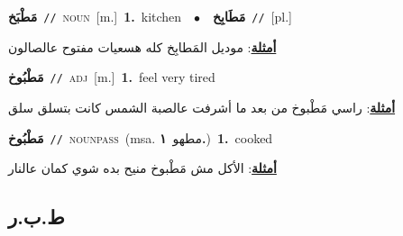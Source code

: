 \documentclass[10pt,a4paper,twoside]{article} %
\begin{document}
\begin{multicols}{2}
{\setlength\topsep{0pt}\textbf{\foreignlanguage{arabic}{مَطْبَخ}}\ {\color{gray}\texttt{//}\color{black}}\ \textsc{noun}\ [m.]\ \textbf{1.}~kitchen\ \ $\bullet$\ \ \setlength\topsep{0pt}\textbf{\foreignlanguage{arabic}{مَطَابِخ}}\ {\color{gray}\texttt{//}\color{black}}\ [pl.]\  \begin{flushright}\color{gray}\foreignlanguage{arabic}{\textbf{\underline{\foreignlanguage{arabic}{أمثلة}}}: موديل المَطابِخ كله هسعيات مفتوح عالصالون}\end{flushright}\color{black}} \vspace{2mm}

{\setlength\topsep{0pt}\textbf{\foreignlanguage{arabic}{مَطْبُوخ}}\ {\color{gray}\texttt{//}\color{black}}\ \textsc{adj}\ [m.]\ \textbf{1.}~feel very tired\  \begin{flushright}\color{gray}\foreignlanguage{arabic}{\textbf{\underline{\foreignlanguage{arabic}{أمثلة}}}: راسي مَطْبوخ من بعد ما أشرفت عالصبة الشمس كانت بتسلق سلق}\end{flushright}\color{black}} \vspace{2mm}

{\setlength\topsep{0pt}\textbf{\foreignlanguage{arabic}{مَطْبُوخ}}\ {\color{gray}\texttt{//}\color{black}}\ \textsc{noun\textunderscore pass}\ \color{gray}(msa. \foreignlanguage{arabic}{مطهو}~\foreignlanguage{arabic}{\textbf{١.}})\color{black}\ \textbf{1.}~cooked\  \begin{flushright}\color{gray}\foreignlanguage{arabic}{\textbf{\underline{\foreignlanguage{arabic}{أمثلة}}}: الأكل مش مَطْبوخ منيح بده شوي كمان عالنار}\end{flushright}\color{black}} \vspace{2mm}

\vspace{-3mm}
\subsection*{\color{blue}\foreignlanguage{arabic}{ط.ب.ر}\color{blue}{}} 


\end{multicols}
\end{document}

